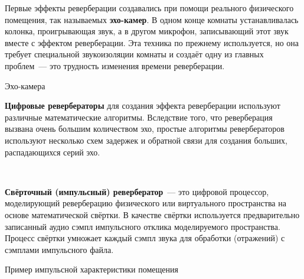 \documentclass{beamer}
\begin{document}
\begin{frame}
  Первые эффекты реверберации создавались при помощи реального физического помещения, так называемых \textbf{эхо-камер}. В одном конце комнаты устанавливалась колонка, проигрывающая звук, а в другом микрофон, записывающий этот звук вместе с эффектом реверберации. Эта техника по прежнему используется, но она требует специальной звукоизоляции комнаты и создаёт одну из главных проблем~--- это трудность изменения времени реверберации.

  \begin{block}{Эхо-камера}
  \end{block}  
\end{frame}

\begin{frame}
  \textbf{Цифровые ревербераторы} для создания эффекта реверберации используют различные математические алгоритмы. Вследствие того, что реверберация вызвана очень большим количеством эхо, простые алгоритмы ревербераторов используют несколько схем задержек и обратной связи для создания больших, распадающихся серий эхо.
  
  ~
  
  \textbf{Свёрточный (импульсный) ревербератор}~--- это цифровой процессор, моделирующий реверберацию физического или виртуального пространства на основе математической свёртки. В качестве свёртки используется предварительно записанный аудио сэмпл импульсного отклика моделируемого пространства. Процесс свёртки умножает каждый сэмпл звука для обработки (отражений) с сэмплами импульсного файла.  
\end{frame}

\begin{frame}
  \begin{block}{Пример импульсной характеристики помещения}
  \end{block}
\end{frame}
\end{document}
